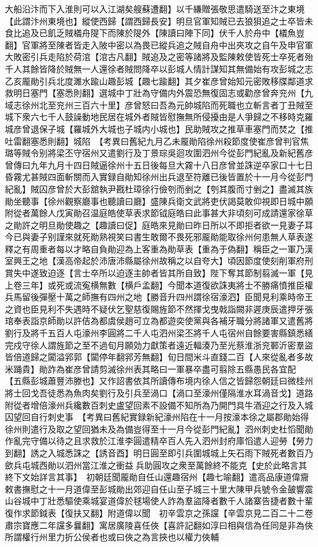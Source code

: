 大船沿汴而下入淮則可以入江湖矣艘蘇遭翻】以千縑贈張敬思遣騎送至汴之東境【此謂汴州東境也】縱使西歸【謂西歸長安】明旦官軍知賊已去狼狽追之士卒皆未食比追及已飢乏賊檥舟隄下而陳於隄外【陳讀曰陣下同】伏千人於舟中【檥魚豈翻】官軍將至陳者皆走入陂中密以為畏已縱兵追之賊自舟中出夾攻之自午及申官軍大敗密引兵走陷於荷涫【涫古凡翻】賊追及之密等諸將及監陳敕使皆死士卒死者殆千人其餘皆降於賊無一人還徐者賊問降卒以彭城人情計謀知其無備始有攻彭城之志乙亥龎勛引兵北度濉水踰山趣彭城【趣七踰翻】其夕崔彦曾始知元密敗移牒鄰道求救明日塞門【塞悉則翻】選城中丁壯為守備内外震恐無復固志或勸彦曾奔兖州【九域志徐州北至兖州三百六十里】彦曾怒曰吾為元帥城陷而死職也立斬言者丁丑賊至城下衆六七千人鼓譟動地民居在城外者賊皆慰撫無所侵擾由是人爭歸之不移時克羅城彦曾退保子城【羅城外大城也子城内小城也】民助賊攻之推草車塞門而焚之【推吐雷翻塞悉則翻】城陷　【考異曰舊紀九月乙未龎勛陷徐州殺節度使崔彦曾判官焦璐等賊令别將梁丕守宿州又遣劉行及丁景琮吳迴攻圍泗州今從彭門紀亂及新紀舊彦曾傳曰九年九月十四日賊逼徐州十五日後每旦大霧十八日彦曾並誅逆卒家口十七日昏霧尤甚賊四面斬關而入實録自勛知徐州出兵退至符離已後皆置於十一月今從彭門紀亂】賊囚彦曾於大彭舘執尹戡杜璋徐行儉刳而剉之【刳其腹而寸剉之】盡滅其族勛坐聽事【徐州觀察廳事也聽讀曰廳】盛陳兵衛文武將吏伏謁莫敢仰視即日城中願附從者萬餘人戊寅勛召温庭皓使草表求節钺庭皓曰此事甚大非頃刻可成請還家徐草之勛許之明旦勛使趣之【趣讀曰促】庭皓來見勛曰昨日所以不即拒者欲一見妻子耳今已與妻子别謹來就死勛熟視笑曰書生敢爾不畏死邪龎勛能取徐州何患無人草表遂釋之有周重者每以才略自負勛迎為上客重為勛草表【重為于偽翻】稱臣之一軍乃漢室興王之地【漢高帝起於沛唐沛縣屬徐州故稱之以自夸大】頃因節度使刻削軍府刑賞失中遂致迫逐【言士卒所以迫逐主帥者皆其所自致】陛下奪其節制翦滅一軍【見上卷三年】或死或流寃横無數【横戶孟翻】今聞本道復欲誅夷將士不勝痛憤推臣權兵馬留後彈壓十萬之師撫有四州之地【勝音升四州謂徐宿濠泗】臣聞見利乘時帝王之資也臣見利不失遇時不疑伏乞聖慈復賜旌節不然揮戈曳戟詣闕非遲庚辰遣押牙張琯奉表詣京師勛以許佶為都虞侯趙可立為都遊奕使黨與各補牙職分將諸軍又遣舊將劉行及將千五百人屯濠州李圓將二千人屯泗州梁丕將千人屯宿州自餘要害縣鎮悉繕完戍守徐人謂旌節之至不過旬月願効力獻策者遠近輻湊乃至光蔡淮浙兖鄆沂密羣盜皆倍道歸之闐溢郛郭【闐停年翻郛芳無翻】旬日間米斗直錢二百【人來從亂者多故米踊貴】勛詐為崔彦曾請剪滅徐州表其略曰一軍暴卒盡可翦除五縣愚民各宜配【五縣彭城蕭豐沛滕也】又作詔書依其所讀傳布境内徐人信之皆歸怨朝廷曰微桂州將士回戈吾徒悉為魚肉矣劉行及引兵至渦口【渦口至濠州僅隔淮水耳渦音戈】道路附從者增倍濠州兵纔數百刺史盧望回素不設備不知所為乃開門具牛酒迎之行及入城囚望回自行刺史事　【考異曰舊紀實録新紀濠州陷在十一月按濠本徐之屬郡勛始得徐州則遣行及取之望回猶未及為備豈得至十一月今從彭門紀亂】泗州刺史杜慆聞勛作亂完守備以待之且求救於江淮李圓遣精卒百人先入泗州封府庫慆遣人迎勞【勞力到翻】誘之入城悉誅之【誘音酉】明日圓至即引兵圍城城上矢石雨下賊死者數百乃歛兵屯城西勛以泗州當江淮之衝益兵助圓攻之衆至萬餘終不能克【史於此略言其終下文始詳言其事】　初朝廷聞龎勛自任山還趣宿州【趣七喻翻】遣高品康道偉齎敕書撫慰之十一月道偉至彭城勛出郊迎自任山至子城三十里大陳甲兵號令金皷響震山谷城中丁壯悉驅使乘城宴道偉於毬場使人詐為羣盜降者數千人諸寨告捷者數十輩復作求節鉞表【復扶又翻】附道偉以聞　初辛雲京之孫讜【辛雲京見二百二十二卷肅宗寶應二年讜多曩翻】寓居廣陵喜任俠【喜許記翻如淳曰相與信為任同是非為俠所謂權行州里力折公侯者也或曰俠之為言挾也以權力俠輔